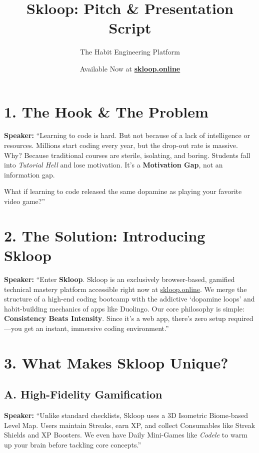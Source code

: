 \documentclass[12pt,a4paper]{article}
\title{\textbf{\Huge Skloop: Pitch \& Presentation Script}}
\author{The Habit Engineering Platform}
\date{Available Now at \href{https://skloop.online}{\textbf{skloop.online}}}
\begin{document}
\maketitle

\section*{1. The Hook \& The Problem}
\textbf{Speaker:} ``Learning to code is hard. But not because of a lack of intelligence or resources. Millions start coding every year, but the drop-out rate is massive. Why? Because traditional courses are sterile, isolating, and boring. Students fall into \textit{Tutorial Hell} and lose motivation. It's a \textbf{Motivation Gap}, not an information gap.

What if learning to code released the same dopamine as playing your favorite video game?''

\vspace{0.5cm}

\section*{2. The Solution: Introducing Skloop}
\textbf{Speaker:} ``Enter \textbf{Skloop}. Skloop is an exclusively browser-based, gamified technical mastery platform accessible right now at \href{https://skloop.online}{skloop.online}. We merge the structure of a high-end coding bootcamp with the addictive `dopamine loops' and habit-building mechanics of apps like Duolingo. Our core philosophy is simple: \textbf{Consistency Beats Intensity}. Since it's a web app, there's zero setup required—you get an instant, immersive coding environment.''

\vspace{0.5cm}

\section*{3. What Makes Skloop Unique?}

\subsection*{A. High-Fidelity Gamification}
\textbf{Speaker:} ``Unlike standard checklists, Skloop uses a 3D Isometric Biome-based Level Map. Users maintain Streaks, earn XP, and collect Consumables like Streak Shields and XP Boosters. We even have Daily Mini-Games like \textit{Codele} to warm up your brain before tackling core concepts.''
\end{document}
